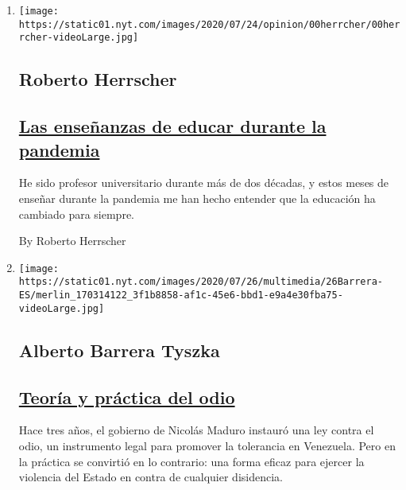 \begin{enumerate}
\def\labelenumi{\arabic{enumi}.}
\item
  \texttt{[image: https://static01.nyt.com/images/2020/07/24/opinion/00herrcher/00herrcher-videoLarge.jpg]}

  \hypertarget{roberto-herrscher}{%
  \subsection{Roberto Herrscher}\label{roberto-herrscher}}

  \hypertarget{las-enseuxf1anzas-de-educar-durante-la-pandemia}{%
  \subsection{\texorpdfstring{\href{/es/2020/07/27/espanol/opinion/clases-universidad-coronavirus.html}{Las
  enseñanzas de educar durante la
  pandemia}}{Las enseñanzas de educar durante la pandemia}}\label{las-enseuxf1anzas-de-educar-durante-la-pandemia}}

  He sido profesor universitario durante más de dos décadas, y estos
  meses de enseñar durante la pandemia me han hecho entender que la
  educación ha cambiado para siempre.

  By Roberto Herrscher
\item
  \texttt{[image: https://static01.nyt.com/images/2020/07/26/multimedia/26Barrera-ES/merlin\_170314122\_3f1b8858-af1c-45e6-bbd1-e9a4e30fba75-videoLarge.jpg]}

  \hypertarget{alberto-barrera-tyszka}{%
  \subsection{Alberto Barrera Tyszka}\label{alberto-barrera-tyszka}}

  \hypertarget{teoruxeda-y-pruxe1ctica-del-odio}{%
  \subsection{\texorpdfstring{\href{/es/2020/07/26/espanol/opinion/nicmer-evans-venezuela.html}{Teoría
  y práctica del
  odio}}{Teoría y práctica del odio}}\label{teoruxeda-y-pruxe1ctica-del-odio}}

  Hace tres años, el gobierno de Nicolás Maduro instauró una ley contra
  el odio, un instrumento legal para promover la tolerancia en
  Venezuela. Pero en la práctica se convirtió en lo contrario: una forma
  eficaz para ejercer la violencia del Estado en contra de cualquier
  disidencia.


\end{enumerate}
